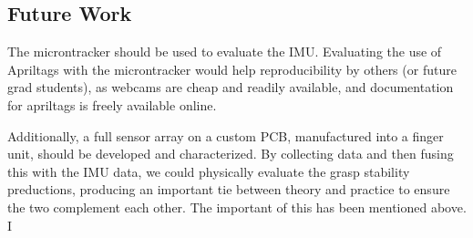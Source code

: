 \documentclass[12pt]{article}
\begin{document}
%
%

\subsection{Future Work}

The microntracker should be used to evaluate the IMU. Evaluating the use of Apriltags with the
microntracker would help reproducibility by others (or future grad students), as webcams are cheap
and readily available, and documentation for apriltags is freely available online.

Additionally, a full sensor array on a custom PCB, manufactured into a finger unit, should be
developed and characterized. By collecting data and then fusing this with the IMU data, we could
physically evaluate the grasp stability preductions, producing an important tie between theory and
practice to ensure the two complement each other. The important of this has been mentioned above.
I 
\end{document}
